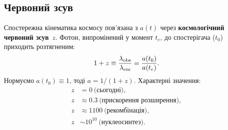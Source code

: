 \documentclass[12pt, a4paper]{article}
\begin{document}
\subsection{Червоний зсув}

Спостережна кінематика космосу пов'язана з $a(t)$ через
\textbf{космологічний червоний зсув}~$z$. Фотон, випромінений
у момент $t_e$, до спостерігача ($t_0$) приходить розтягненим:
\begin{equation}\label{eq:redshift}
  1 + z \equiv \frac{\lambda_{\rm obs}}{\lambda_{\rm em}}
             = \frac{a(t_0)}{a(t_e)}.
\end{equation}
Нормуємо $a(t_0) \equiv 1$, тоді $a = 1/(1+z)$.
Характерні значення:
\begin{align*}
  z &= 0\ \text{(сьогодні)}, \\
  z &\approx 0.3\ \text{(прискорення розширення)}, \\
  z &\approx 1100\ \text{(рекомбінація)}, \\
  z &\sim 10^{10}\ \text{(нуклеосинтез)}.
\end{align*}
\end{document}

